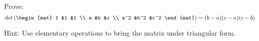 
\begin{Exercise}[
name={Vandermonde's determinant},
title={}, 
difficulty=0,
origin={\cite{JH}}]
Prove:
\begin{equation*}
\det\left(
         \begin{mat}
             1    &1   &1    \\
             a    &b   &c    \\
             a^2  &b^2 &c^2
         \end{mat}
         \right)
=(b-a)(c-a)(c-b)
\end{equation*}
\end{Exercise}

\begin{Answer}
Hint: Use elementary operations to bring the matrix under triangular form.
\end{Answer}
